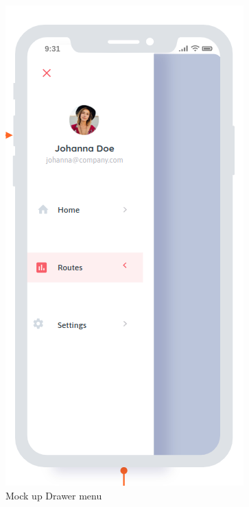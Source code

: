    \begin{figure}[h!]
        \includegraphics[width=\linewidth]{./graphics/drawer_Mockup.png}
        \caption{Mock up Drawer menu}
        \label{fig:DrawerMockup}
    \end{figure}

